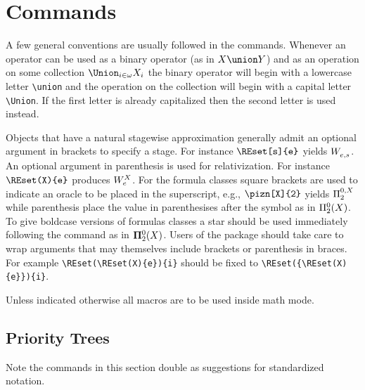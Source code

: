 \documentclass[leqno,11pt]{amsart}
\begin{document}




\section{Commands}
A few general conventions are usually followed in the commands.  Whenever an operator can be used as a binary operator (as in \( X \union Y \)) and as an operation on some collection \( \Union_{i \in \omega} X_i \) the binary operator will begin with a lowercase letter \verb=\union= and the operation on the collection will begin with a capital letter \verb=\Union=.  If the first letter is already capitalized then the second letter is used instead.

Objects that have a natural stagewise approximation generally admit an optional argument in brackets to specify a stage.  For instance \( \verb=\REset[s]{e}= \) yields \( \REset[s]{e} \). An optional argument in parenthesis is used for relativization.  For instance \( \verb=\REset(X){e}= \) produces \( \REset(X){e} \).  For the formula classes square brackets are used to indicate an oracle to be placed in the superscript, e.g.,  \( \verb=\pizn[X]{2}= \) yields \( \pizn[X]{2} \) while parenthesis place the value in parenthesises after the symbol as in \( \pizn(X){2} \).  To give boldcase versions of formulas classes a star should be used immediately following the command as in \( \pizn*(X){2} \).    Users of the package should take care to wrap arguments that may themselves include brackets or parenthesis in braces.  For example \verb=\REset(\REset(X){e}){i}= should be fixed to \verb=\REset({\REset(X){e}}){i}=.

Unless indicated otherwise all macros are to be used inside math mode. 


\subsection{Priority Trees}

Note the commands in this section double as suggestions for standardized notation.  
\end{document}
